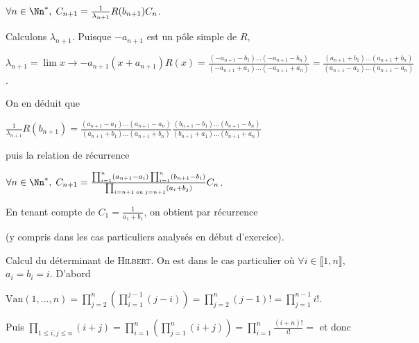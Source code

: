 {{\begin{center}
$\forall n\in\Nn^*,\;C_{n+1}=\frac{1}{\lambda_{n+1}}R(b_{n+1})C_n$.
\end{center}

Calculons $\lambda_{n+1}$. Puisque $-a_{n+1}$ est un pôle simple de $R$, 

\begin{center}
$\lambda_{n+1}=\lim{x \rightarrow -a_{n+1}}(x+a_{n+1})R(x)=\frac{(-a_{n+1}-b_1)\ldots(-a_{n+1}-b_n)}{(-a_{n+1}+a_1)\ldots(-a_{n+1}+a_n)}=\frac{(a_{n+1}+b_1)\ldots(a_{n+1}+b_n)}{(a_{n+1}-a_1)\ldots(a_{n+1}-a_n)}$.
\end{center}

On en déduit que

\begin{center}
$\frac{1}{\lambda_{n+1}} R(b_{n+1}) =\frac{(a_{n+1}-a_1)\ldots(a_{n+1}-a_n)}{(a_{n+1}+b_1)\ldots(a_{n+1}+b_n)}\frac{(b_{n+1}-b_1)\ldots(b_{n+1}-b_n)}{(b_{n+1}+a_1)\ldots(b_{n+1}+a_n)}$
\end{center}

puis la relation de récurrence

\begin{center}
$\forall n\in\Nn^*,\;C_{n+1}=\frac{\prod_{i=1}^{n}(a_{n+1}-a_i)\prod_{i=1}^{n}(b_{n+1}-b_i)}{\prod_{i=n+1\;\text{ou}\;j=n+1}(a_{i}+b_j)}C_n$.
\end{center}

En tenant compte de $C_1=\frac{1}{a_1+b_1}$, on obtient par récurrence

\begin{center}
\end{center}

(y compris dans les cas particuliers analysés en début d'exercice).

Calcul du déterminant de \textsc{Hilbert}. On est dans le cas particulier où $\forall i\in\llbracket1,n\rrbracket$, $a_i = b_i = i$.
D'abord

\begin{center}
$\text{Van}(1,...,n)=\prod_{j=2}^{n}\left(\prod_{i=1}^{j-1}(j-i)\right)=\prod_{j=2}^{n}(j-1)! =\prod_{j=1}^{n-1}i!$.
\end{center}

Puis $\prod_{1\leqslant i,j\leqslant n}^{}(i+j)=\prod_{i=1}^{n}\left(\prod_{j=1}^{n}(i+j)\right)=\prod_{i=1}^{n}\frac{(i+n)!}{i!}=$   et donc

\begin{center}
\end{center}
}
}

